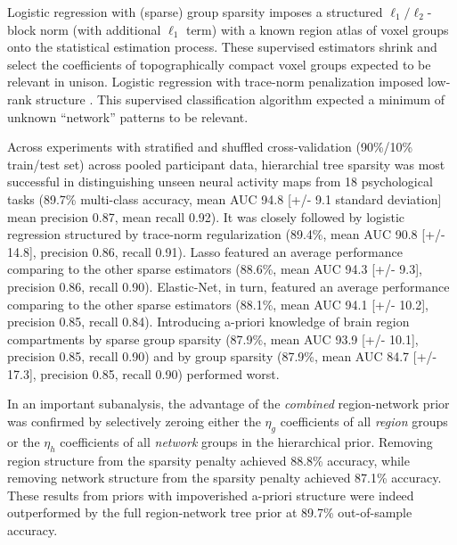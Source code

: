 \documentclass[runningheads,a4paper]{llncs}
\begin{document}
Logistic regression with (sparse) group sparsity
imposes a structured $\ell_1/\ell_2$-block norm (with additional $\ell_1$ term)
with a known region atlas of voxel groups
onto the statistical estimation process.
These supervised estimators shrink and select the coefficients
of topographically compact voxel groups expected to
be relevant in unison.
%
Logistic regression with trace-norm penalization
imposed low-rank structure \cite{harchaoui2012large}.
This supervised classification algorithm
expected a minimum of unknown ``network'' patterns
to be relevant.

%


Across experiments with stratified and shuffled
cross-validation (90\%/10\% train/test set) across pooled participant data,
hierarchial tree sparsity was most successful
in distinguishing unseen neural activity maps from 18 psychological tasks
(89.7\% multi-class accuracy, mean AUC 94.8 [+/- 9.1 standard deviation]
mean precision 0.87, mean recall 0.92).
It was closely followed by logistic regression
structured by trace-norm regularization
(89.4\%, mean AUC 90.8 [+/- 14.8],
precision 0.86, recall 0.91).
Lasso featured an average performance comparing to the other sparse estimators
(88.6\%, mean AUC 94.3 [+/- 9.3],
precision 0.86, recall 0.90).
Elastic-Net, in turn, featured an
average performance comparing to the other sparse estimators
(88.1\%, mean AUC 94.1 [+/- 10.2],
precision 0.85, recall 0.84).
Introducing a-priori knowledge of brain region compartments
by sparse group sparsity
(87.9\%, mean AUC 93.9 [+/- 10.1], precision 0.85, recall 0.90)
and
by group sparsity
(87.9\%, mean AUC 84.7 [+/- 17.3], precision 0.85, recall 0.90)
performed worst.



In an important subanalysis,
the advantage of the \textit{combined} region-network prior was confirmed by
selectively zeroing
either the $\eta_g$ coefficients of all \textit{region} groups
or the $\eta_h$ coefficients of all \textit{network} groups in the hierarchical prior.
Removing region structure from the sparsity penalty achieved
88.8\% accuracy,
while removing network structure from the sparsity penalty achieved
87.1\% accuracy.
These results from priors with impoverished a-priori structure
were indeed outperformed by
the full region-network tree prior at 89.7\% out-of-sample accuracy.
\end{document}
